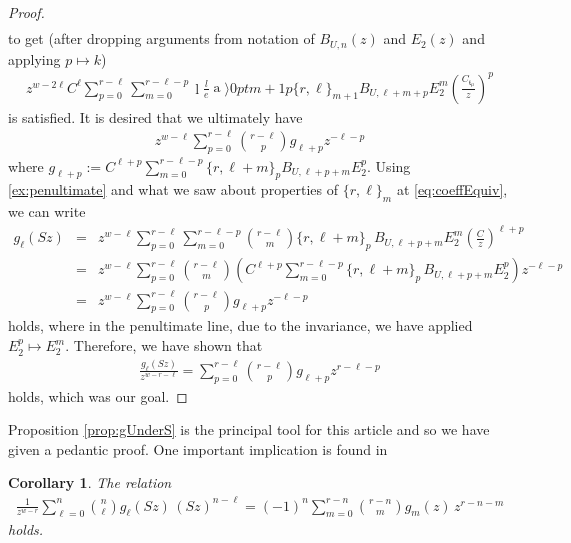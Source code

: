 \documentclass[11pt]{article}
\newtheorem{cor}{Corollary}
\DeclareRobustCommand{\binomer}{\genfrac\langle\rangle{0pt}{}}
\begin{document}
\begin{proof}
\begin{eqnarray*}
            \end{eqnarray*}
        to get (after dropping arguments from notation of $ B_{U, n}(z) $ and $ E_2(z) $ and applying $ p \mapsto k $)
            \begin{eqnarray}\label{ex:penultimate}
                z^{w-2\ell}C^\ell \sum_{p=0}^{r-\ell}\sum^{r-\ell-p}_{m=0} \binomer{m+1}{p}\{r,\ell\}_{m+1} B_{U, \ell + m+p}E_2^{m}\left( \frac{C_{\mathfrak{t}_\mu}}{z}\right)^{p}
            \end{eqnarray}
        is satisfied. It is desired that we ultimately have 
            \begin{eqnarray*}
                z^{w-\ell}\sum_{p=0}^{r-\ell}\binom{r-\ell}{p} g_{\ell + p}z^{-\ell - p}
            \end{eqnarray*}
        where $ g_{\ell + p} := C^{\ell + p}\sum^{r-\ell-p}_{m=0}\{r,\ell+m\}_p B_{U,\ell+ p+m}E_2^{p} $. Using \eqref{ex:penultimate} and what we saw about properties of $ \{r,\ell\}_m $ at \eqref{eq:coeffEquiv}, we can write
            \begin{eqnarray*}
                g_{\ell}(Sz) &=& z^{w-\ell} \sum_{p=0}^{r-\ell}\sum^{r-\ell-p}_{m=0} \binom{r-\ell}{m}\{r,\ell+m\}_{p}\, B_{U, \ell +p+m}E_2^{m}\left( \frac{C}{z}\right)^{\ell+p} \\
                &=& z^{w-\ell} \sum_{p=0}^{r-\ell}\binom{r-\ell}{m}\left( {C}^{\ell+p}\sum^{r-\ell-p}_{m=0}  \{r,\ell+m\}_{p}\, B_{U, \ell +p+m}E_2^{p}\right){z}^{-\ell-p} \\
                &=& z^{w-\ell}\sum_{p=0}^{r-\ell}\binom{r-\ell}{p} g_{\ell + p}z^{-\ell - p}
            \end{eqnarray*}
        holds, where in the penultimate line, due to the invariance, we have applied $ E_2^p \mapsto E_2^m $. Therefore, we have shown that
            \begin{eqnarray*}
                \frac{g_\ell(Sz)}{z^{w-r-\ell}} = \sum^{r-\ell}_{p=0}\binom{r-\ell}{p}g_{\ell + p}z^{r-\ell-p}
            \end{eqnarray*}
        holds, which was our goal.
    \end{proof}
Proposition \ref{prop:gUnderS} is the principal tool for this article and so we have given a pedantic proof. One important implication is found in 
    \begin{cor}\label{cor:convolvUnderS}
        The relation 
            \begin{eqnarray*}
                \frac{1}{z^{w-r}}\sum_{\ell=0}^{n}\binom{n}{\ell}{g_{\ell}(Sz)}\,{(Sz)^{n-\ell}} = (-1)^n\sum_{m=0}^{r-n}\binom{r-n}{m}g_m(z)\,z^{r-n-m}
            \end{eqnarray*}
        holds. 
    \end{cor}
\end{document}
